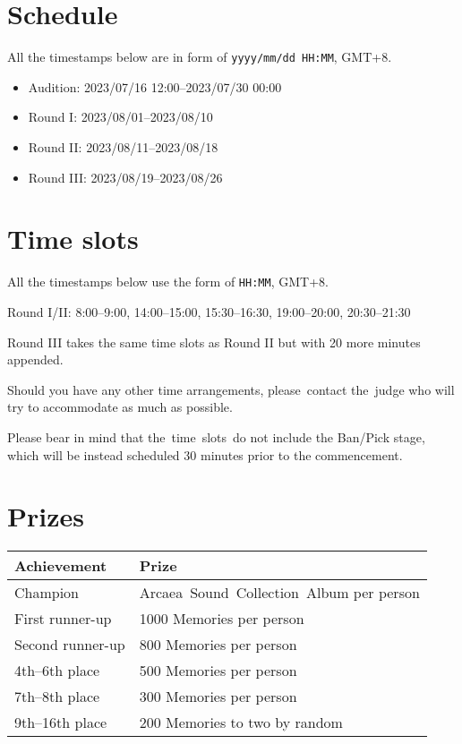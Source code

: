 \documentclass{article}
\begin{document}
\section{Schedule}

All the timestamps below are in form of
\texttt{yyyy/mm/dd HH:MM}, GMT+8.

\begin{itemize}
	\item   Audition: 2023/07/16 12:00--2023/07/30 00:00
	\item   Round I: 2023/08/01--2023/08/10
	\item   Round II: 2023/08/11--2023/08/18
	\item   Round III: 2023/08/19--2023/08/26
\end{itemize}

\section{Time slots}

All the timestamps below use the form of
\texttt{HH:MM}, GMT+8.

Round I/II: 8:00--9:00, 14:00--15:00, 15:30--16:30, 19:00--20:00, 20:30--21:30

Round III takes the same time slots as Round II
but with 20 more minutes appended.

Should you have any other time arrangements,
please contact the judge who will
try to accommodate as much as possible.

Please bear in mind that
the time slots do not include the Ban/Pick stage,
which will be instead scheduled 30 minutes prior to the commencement.

\section{Prizes}

\begin{table}[!htbp]
	\centering
	\begin{tabular}{ll}
		\hline
		Achievement  %
		                 & Prize                                    \\ \hline
		Champion         & Arcaea Sound Collection Album per person \\
		First runner-up  & 1000 Memories per person                 \\
		Second runner-up & 800 Memories per person                  \\
		4th--6th place   & 500 Memories per person                  \\
		7th--8th place   & 300 Memories per person                  \\
		9th--16th place  & 200 Memories to two by random            \\ \hline
	\end{tabular}
\end{table}
\end{document}
